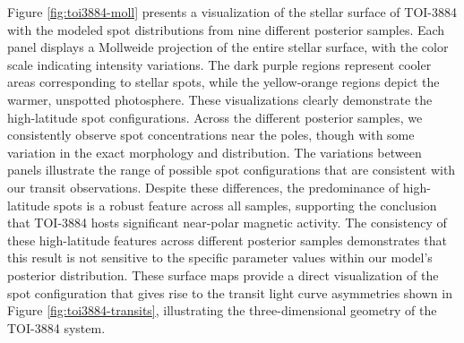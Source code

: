\documentclass[twocolumn]{aastex631}
\begin{document}
Figure \ref{fig:toi3884-moll} presents a visualization of the stellar surface of TOI-3884 with the modeled spot 
distributions from nine different posterior samples. Each panel displays a Mollweide projection of the entire stellar surface, 
with the color scale indicating intensity variations. The dark purple regions represent cooler areas corresponding to stellar 
spots, while the yellow-orange regions depict the warmer, unspotted photosphere.
These visualizations clearly demonstrate the high-latitude spot configurations. Across the different posterior samples, 
we consistently observe spot concentrations near the poles, though with some variation in the exact morphology and distribution. 
The variations between panels illustrate the range of possible spot configurations that are consistent with our transit 
observations. Despite these differences, the predominance of high-latitude spots is a robust feature across all samples, 
supporting the conclusion that TOI-3884 hosts significant near-polar magnetic activity. 
The consistency of these high-latitude features across different posterior samples demonstrates that this result is 
not sensitive to the specific parameter values within our model's posterior distribution.
These surface maps provide a direct visualization of the spot configuration that gives rise to the transit light curve 
asymmetries shown in Figure \ref{fig:toi3884-transits}, illustrating the three-dimensional 
geometry of the TOI-3884 system.
\end{document}

